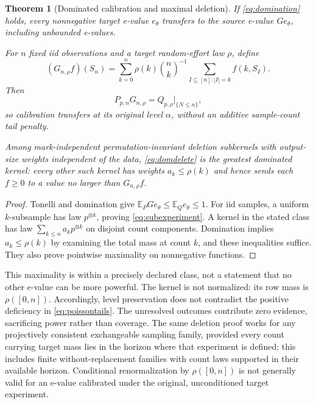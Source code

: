 \documentclass[11pt]{article}
\numberwithin{equation}{section}
\newtheorem{theorem}{Theorem}[section]
\theoremstyle{definition}
\theoremstyle{remark}
\newcommand{\E}{\mathbb E}\newcommand{\Pp}{\mathbb P}\newcommand{\R}{\mathbb R}\newcommand{\N}{\mathbb N}
\begin{document}
\begin{theorem}[Dominated calibration and maximal deletion]\label{thm:deletioncal}
If \eqref{eq:domination} holds, every nonnegative target e-value $e_\theta$ transfers to the source e-value $Ge_\theta$, including unbounded e-values.

For $n$ fixed iid observations and a target random-effort law $\rho$, define
\begin{equation}\label{eq:domdelete}
 (G_{n,\rho}f)(S_n)
 =\sum_{k=0}^{n}\rho(k)\binom nk^{-1}
       \sum_{I\subseteq[n]:|I|=k}f(k,S_I).
\end{equation}
Then
\begin{equation}\label{eq:subexperiment}
 P_{p,n}G_{n,\rho}=Q_{p,\rho}\big|_{\{N\le n\}},
\end{equation}
so calibration transfers at its original level $\alpha$, without an additive sample-count tail penalty.

Among mark-independent permutation-invariant deletion subkernels with output-size weights independent of the data, \eqref{eq:domdelete} is the greatest dominated kernel: every other such kernel has weights $a_k\le\rho(k)$ and hence sends each $f\ge0$ to a value no larger than $G_{n,\rho}f$.
\end{theorem}
\begin{proof}
Tonelli and domination give $\E_PGe_\theta\le\E_Qe_\theta\le1$. For iid samples, a uniform $k$-subsample has law $p^{\otimes k}$, proving \eqref{eq:subexperiment}. A kernel in the stated class has law $\sum_{k\le n}a_kp^{\otimes k}$ on disjoint count components. Domination implies $a_k\le\rho(k)$ by examining the total mass at count $k$, and these inequalities suffice. They also prove pointwise maximality on nonnegative functions.
\end{proof}
This maximality is within a precisely declared class, not a statement that no other e-value can be more powerful. The kernel is not normalized: its row mass is $\rho([0,n])$. Accordingly, level preservation does not contradict the positive deficiency in \eqref{eq:poissontails}. The unresolved outcomes contribute zero evidence, sacrificing power rather than coverage. The same deletion proof works for any projectively consistent exchangeable sampling family, provided every count carrying target mass lies in the horizon where that experiment is defined; this includes finite without-replacement families with count laws supported in their available horizon. Conditional renormalization by $\rho([0,n])$ is not generally valid for an e-value calibrated under the original, unconditioned target experiment.
\end{document}
